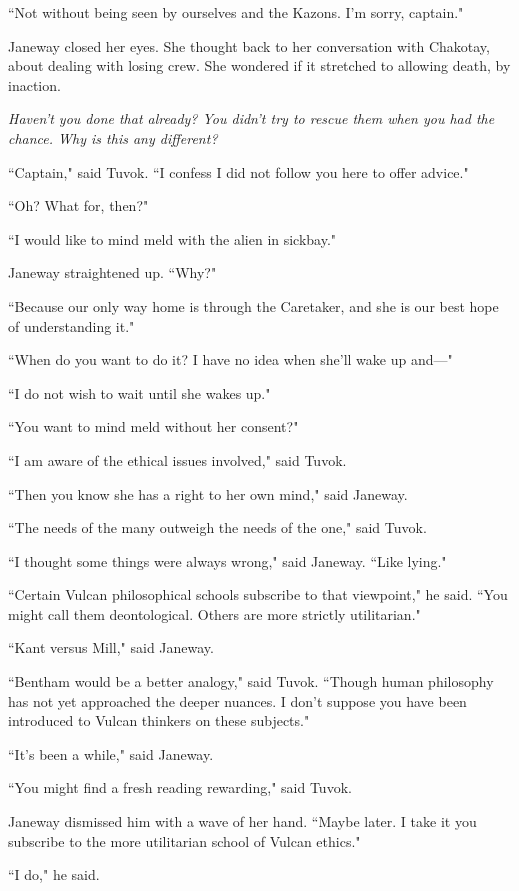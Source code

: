 \documentclass[twoside,letterpaper,12pt]{memoir}
\begin{document}
``Not without being seen by ourselves and the Kazons. I'm sorry, captain." 

Janeway closed her eyes. She thought back to her conversation with Chakotay, about dealing with losing crew. She wondered if it stretched to allowing death, by inaction. 

\textit{Haven't you done that already? You didn't try to rescue them when you had the chance. Why is this any different?} 

``Captain," said Tuvok. ``I confess I did not follow you here to offer advice." 

``Oh? What for, then?" 

``I would like to mind meld with the alien in sickbay." 

Janeway straightened up. ``Why?" 

``Because our only way home is through the Caretaker, and she is our best hope of understanding it." 

``When do you want to do it? I have no idea when she'll wake up and---" 

``I do not wish to wait until she wakes up." 

``You want to mind meld without her consent?" 

``I am aware of the ethical issues involved," said Tuvok. 

``Then you know she has a right to her own mind," said Janeway. 

``The needs of the many outweigh the needs of the one," said Tuvok. 

``I thought some things were always wrong," said Janeway. ``Like lying." 

``Certain Vulcan philosophical schools subscribe to that viewpoint," he said. ``You might call them deontological. Others are more strictly utilitarian." 

``Kant versus Mill," said Janeway. 

``Bentham would be a better analogy," said Tuvok. ``Though human philosophy has not yet approached the deeper nuances. I don't suppose you have been introduced to Vulcan thinkers on these subjects." 

``It's been a while," said Janeway. 

``You might find a fresh reading rewarding," said Tuvok. 

Janeway dismissed him with a wave of her hand. ``Maybe later. I take it you subscribe to the more utilitarian school of Vulcan ethics." 

``I do," he said. 
\end{document}
